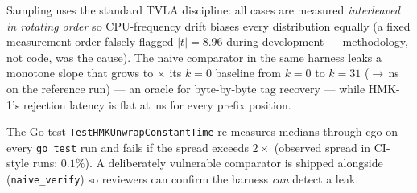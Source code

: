 Sampling uses the standard TVLA discipline: all cases are measured
\emph{interleaved in rotating order} so CPU-frequency drift biases every
distribution equally (a fixed measurement order falsely flagged
$|t| = 8.96$ during development — methodology, not code, was the cause).
The naive comparator in the same harness leaks a monotone slope that grows
to \HmkNaiveGrowth$\times$ its $k{=}0$ baseline from $k{=}0$ to $k{=}31$
(\HmkNaiveKZero$\to$\HmkNaiveKThirtyOne\,ns on the reference run) — an oracle for byte-by-byte tag recovery — while HMK-1's rejection
latency is flat at \HmkCTKZero\,ns for every prefix position.

The Go test \texttt{TestHMKUnwrapConstantTime} re-measures medians through
cgo on every \texttt{go test} run and fails if the spread exceeds $2\times$
(observed spread in CI-style runs: $0.1\%$). A deliberately vulnerable
comparator is shipped alongside (\texttt{naive\_verify}) so reviewers can
confirm the harness \emph{can} detect a leak.


